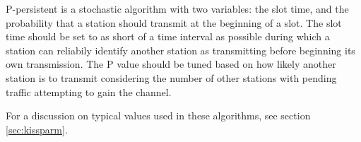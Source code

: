 P-persistent is a stochastic algorithm with two variables: the slot time, and the
probability that a station should transmit at the beginning of a slot. The slot time
should be set to as short of a time interval as possible during which a station can
reliabily identify another station as transmitting 
before beginning its own transmission.
The P value should be tuned based on how likely another station is to transmit 
considering the number of other stations with 
pending traffic attempting to gain the channel.

For a discussion on typical values used in these algorithms, 
see section \ref{sec:kissparm}.

